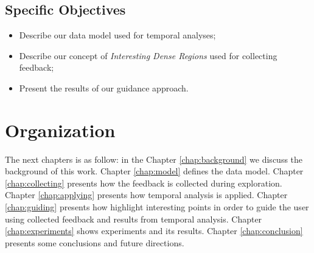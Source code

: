 \subsection{Specific Objectives}

\begin{itemize}
	\item Describe our data model used for temporal analyses;
	\item Describe our concept of {\em Interesting Dense Regions} used for collecting feedback;
	\item Present the results of our guidance approach.
\end{itemize}

\section{Organization}

The next chapters is as follow: in the Chapter \ref{chap:background} we discuss the background of this work. Chapter \ref{chap:model} defines the data model. Chapter \ref{chap:collecting} presents how the feedback is collected during exploration. Chapter \ref{chap:applying} presents how temporal analysis is applied. Chapter \ref{chap:guiding} presents how highlight interesting points in order to guide the user using collected feedback and results from temporal analysis. Chapter \ref{chap:experiments} shows experiments and its results. Chapter \ref{chap:conclusion} presents some conclusions and future directions.
